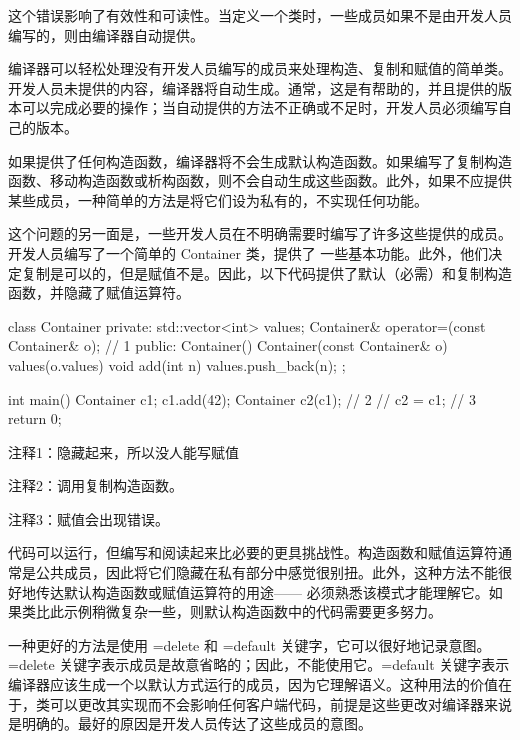 这个错误影响了有效性和可读性。当定义一个类时，一些成员如果不是由开发人员编写的，则由编译器自动提供。


编译器可以轻松处理没有开发人员编写的成员来处理构造、复制和赋值的简单类。开发人员未提供的内容，编译器将自动生成。通常，这是有帮助的，并且提供的版本可以完成必要的操作；当自动提供的方法不正确或不足时，开发人员必须编写自己的版本。

如果提供了任何构造函数，编译器将不会生成默认构造函数。如果编写了复制构造函数、移动构造函数或析构函数，则不会自动生成这些函数。此外，如果不应提供某些成员，一种简单的方法是将它们设为私有的，不实现任何功能。

这个问题的另一面是，一些开发人员在不明确需要时编写了许多这些提供的成员。开发人员编写了一个简单的 Container 类，提供了 一些基本功能。此外，他们决定复制是可以的，但是赋值不是。因此，以下代码提供了默认（必需）和复制构造函数，并隐藏了赋值运算符。


\begin{cpp}
class Container {
private:
  std::vector<int> values;
  Container& operator=(const Container& o); // 1
public:
  Container() {}
  Container(const Container& o) values(o.values) {}
  void add(int n) { values.push_back(n); }
};

int main() {
  Container c1;
  c1.add(42);
  Container c2(c1); // 2
  // c2 = c1; // 3
  return 0;
}
\end{cpp}

{\footnotesize
注释1：隐藏起来，所以没人能写赋值

注释2：调用复制构造函数。

注释3：赋值会出现错误。
}


代码可以运行，但编写和阅读起来比必要的更具挑战性。构造函数和赋值运算符通常是公共成员，因此将它们隐藏在私有部分中感觉很别扭。此外，这种方法不能很好地传达默认构造函数或赋值运算符的用途—— 必须熟悉该模式才能理解它。如果类比此示例稍微复杂一些，则默认构造函数中的代码需要更多努力。


一种更好的方法是使用 =delete 和 =default 关键字，它可以很好地记录意图。=delete 关键字表示成员是故意省略的；因此，不能使用它。=default 关键字表示编译器应该生成一个以默认方式运行的成员，因为它理解语义。这种用法的价值在于，类可以更改其实现而不会影响任何客户端代码，前提是这些更改对编译器来说是明确的。最好的原因是开发人员传达了这些成员的意图。

